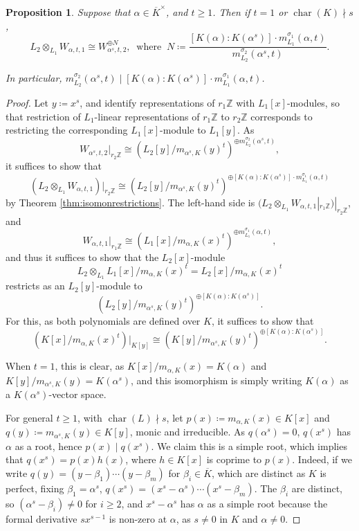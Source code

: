 \documentclass[10pt, reqno, hidelinks]{amsart}
\DeclareMathOperator{\charfield}{char}
\newcommand{\bZ}{{\mathbb Z}}
\numberwithin{thm}{subsection}
\newtheorem{prop}[thm]{Proposition}
\theoremstyle{definition}
\begin{document}
\begin{prop}\label{prop:explicitdescofbasechange}
	Suppose that $\alpha \in \overline{K}^{\times}$, and $t \geq 1$. Then if $t = 1$ or $\charfield(K) \nmid s$,
	\[
		L_2 \otimes_{L_1} W_{\alpha, t, 1} \cong W_{\alpha^s, t, 2}^{\oplus N}, \: \text{ where } \:  N \coloneqq \frac{[K(\alpha) : K(\alpha^s)] \cdot m_{L_1}^{\sigma_1}(\alpha, t)}{m_{L_2}^{\sigma_2}(\alpha^s, t)}.
	\]

	In particular, $m_{L_2}^{\sigma_2}(\alpha^s, t) \mid [K(\alpha) : K(\alpha^s)] \cdot m_{L_1}^{\sigma_1}(\alpha, t)$.
\end{prop}

\begin{proof}
	Let $y \coloneqq x^s$, and identify representations of $r_1 \bZ$ with $L_1[x]$-modules, so that restriction of $L_1$-linear representations of $r_1 \bZ$ to $r_2 \bZ$ corresponds to restricting the corresponding $L_1[x]$-module to $L_1[y]$. As 
	\[
	W_{\alpha^s, t, 2}|_{r_2 \bZ} \cong (L_2[y] / m_{\alpha^s, K}(y)^t)^{\oplus m_{L_2}^{\sigma_2}(\alpha^s, t)},
	\]
	it suffices to show that
	\[
	(L_2 \otimes_{L_1} W_{\alpha, t, 1})|_{r_2 \bZ} \cong (L_2[y] / m_{\alpha^s, K}(y)^t)^{\oplus [K(\alpha) : K(\alpha^s)] \cdot m_{L_1}^{\sigma_1}(\alpha, t)}
	\]
	by Theorem \ref{thm:isomonrestrictions}. The left-hand side is $(L_2 \otimes_{L_1} W_{\alpha, t, 1}|_{r_1 \bZ})|_{r_2 \bZ}$, and
	\[
	W_{\alpha, t, 1}|_{r_1 \bZ} \cong (L_1[x] / m_{\alpha, K}(x)^t)^{\oplus m_{L_1}^{\sigma_1}(\alpha, t)},
	\]
	and thus it suffices to show that the $L_2[x]$-module
	\[
	L_2 \otimes_{L_1} L_1[x] / m_{\alpha, K}(x)^t = L_2[x] / m_{\alpha, K}(x)^t
	\]
	restricts as an $L_2[y]$-module to
	\[
	(L_2[y] / m_{\alpha^s, K}(y)^t)^{\oplus [K(\alpha) : K(\alpha^s)]}.
	\]
	For this, as both polynomials are defined over $K$, it suffices to show that
	\[
	 (K[x] / m_{\alpha, K}(x)^t)|_{K[y]} \cong (K[y] / m_{\alpha^s, K}(y)^t)^{\oplus [K(\alpha) : K(\alpha^s)]}.
	\]

	When $t = 1$, this is clear, as $K[x] / m_{\alpha, K}(x) = K(\alpha)$ and $K[y] / m_{\alpha^s, K}(y) = K(\alpha^s)$, and this isomorphism is simply writing $K(\alpha)$ as a $K(\alpha^s)$-vector space.

	For general $t \geq 1$, with $\charfield(L) \nmid s$, let $p(x) \coloneqq m_{\alpha, K}(x) \in K[x]$ and $q(y) \coloneqq m_{\alpha^s, K}(y) \in K[y]$, monic and irreducible. As $q(\alpha^s) = 0$, $q(x^s)$ has $\alpha$ as a root, hence $p(x) \mid q(x^s)$. We claim this is a simple root, which implies that $q(x^s) = p(x) h(x)$, where $h \in K[x]$ is coprime to $p(x)$. Indeed, if we write $q(y) = (y- \beta_1) \cdots (y - \beta_m)$ for $\beta_i \in \overline{K}$, which are distinct as $K$ is perfect, fixing $\beta_1 = \alpha^s$, $q(x^s) = (x^s- \alpha^s) \cdots (x^s - \beta_m)$. The $\beta_i$ are distinct, so $(\alpha^s - \beta_i) \neq 0$ for $i \geq 2$, and $x^s - \alpha^s$ has $\alpha$ as a simple root because the formal derivative $s x^{s-1}$ is non-zero at $\alpha$, as $s \neq 0$ in $K$ and $\alpha \neq 0$.  


\end{proof}
\end{document}
